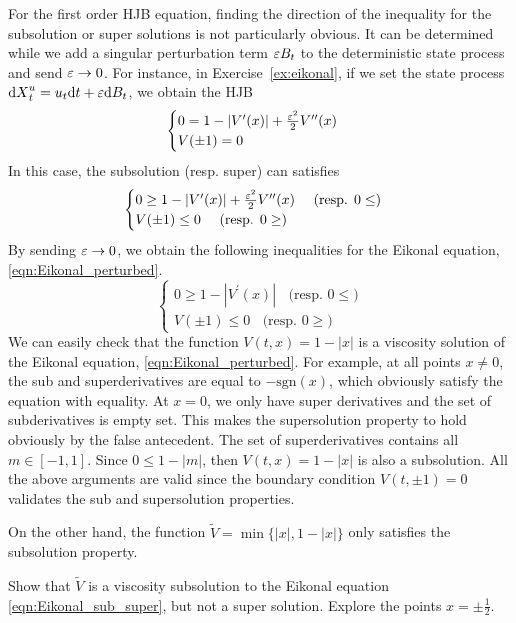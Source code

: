 \documentclass[11pt]{book}
\newcommand{\dd}{\text{\normalfont d}}
\newcommand{\dt}{\text{\normalfont d}t}
\newcommand{\dX}{\text{\normalfont d}X}
\begin{document}
For the first order HJB equation, finding the direction of the inequality for the subsolution or super solutions is not particularly obvious. It can be determined while we add a singular perturbation term $\varepsilon B_t$ to the deterministic state process and send $\varepsilon\to0$. For instance, in Exercise~\ref{ex:eikonal}, if we set the state process ${\dX}_t^u=u_t{{\dt}}+\eps {\dd}B_t$, we obtain the HJB 
\begin{equation}\label{eqn:Eikonal_perturbed}
\begin{cases}
		0=1-|V^{\prime}(x)|+\frac{\varepsilon^2}{2}V^{\prime\prime}(x)\\
		V(\pm1)=0
\end{cases}
\end{equation}
In this case, the subsolution (resp. super) can satisfies
\begin{equation}
\begin{cases}
		0\ge1-|V^{\prime}(x)|+\frac{\varepsilon^2}{2}V^{\prime\prime}(x)~~~~\textrm{(resp. $0\le$)}\\
		V(\pm1)\le0~~~~\textrm{(resp. $0\ge$)}
\end{cases}
\end{equation}
By sending $\varepsilon\to0$, we obtain the following inequalities for the Eikonal equation, \eqref{eqn:Eikonal_perturbed}.
\begin{equation}\label{eqn:Eikonal_sub_super}
\begin{cases}
		0\ge1-|V^{\prime}(x)|~~~~\textrm{(resp. $0\le$)}\\
		V(\pm1)\le0~~~~\textrm{(resp. $0\ge$)}
\end{cases}
\end{equation}
We can easily check that the function $V(t,x)=1-|x|$ is a viscosity solution of the Eikonal equation, \eqref{eqn:Eikonal_perturbed}. For example, at all points $x\neq0$, the sub and superderivatives are equal to $-\textrm{sgn}(x)$, which obviously satisfy the equation with equality. At $x=0$, we only have super derivatives and the set of subderivatives is empty set. This makes the supersolution property to hold obviously by the false antecedent. The set of superderivatives contains all $m\in[-1,1]$. Since $0\le1-|m|$, then $V(t,x)=1-|x|$ is also a subsolution. All the above arguments are valid since the boundary condition $V(t,\pm1)=0$ validates the sub and supersolution properties. 

On the other hand, the function $\tilde{V}=\min\{|x|,1-|x|\}$ only satisfies the subsolution property. 
\begin{ex}
Show that $\tilde{V}$ is a viscosity subsolution to the Eikonal equation \eqref{eqn:Eikonal_sub_super}, but not a super solution. Explore the points $x=\pm\frac12$.
\end{ex}
\end{document}
